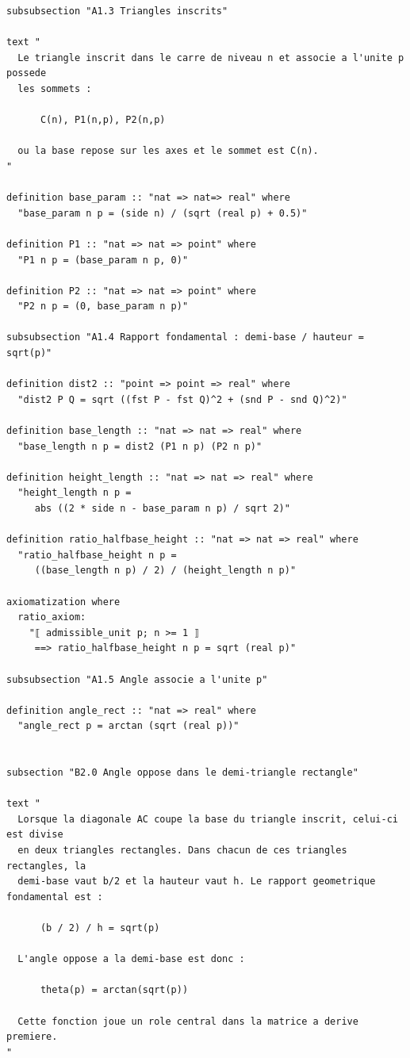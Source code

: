 \documentclass[12pt,a4paper]{article}
\begin{document}
\begin{verbatim}
subsubsection "A1.3 Triangles inscrits"

text "
  Le triangle inscrit dans le carre de niveau n et associe a l'unite p possede
  les sommets :

      C(n), P1(n,p), P2(n,p)

  ou la base repose sur les axes et le sommet est C(n).
"

definition base_param :: "nat => nat=> real" where
  "base_param n p = (side n) / (sqrt (real p) + 0.5)"

definition P1 :: "nat => nat => point" where
  "P1 n p = (base_param n p, 0)"

definition P2 :: "nat => nat => point" where
  "P2 n p = (0, base_param n p)"

subsubsection "A1.4 Rapport fondamental : demi-base / hauteur = sqrt(p)"

definition dist2 :: "point => point => real" where
  "dist2 P Q = sqrt ((fst P - fst Q)^2 + (snd P - snd Q)^2)"

definition base_length :: "nat => nat => real" where
  "base_length n p = dist2 (P1 n p) (P2 n p)"

definition height_length :: "nat => nat => real" where
  "height_length n p =
     abs ((2 * side n - base_param n p) / sqrt 2)"

definition ratio_halfbase_height :: "nat => nat => real" where
  "ratio_halfbase_height n p =
     ((base_length n p) / 2) / (height_length n p)"

axiomatization where
  ratio_axiom:
    "⟦ admissible_unit p; n >= 1 ⟧
     ==> ratio_halfbase_height n p = sqrt (real p)"

subsubsection "A1.5 Angle associe a l'unite p"

definition angle_rect :: "nat => real" where
  "angle_rect p = arctan (sqrt (real p))"


subsection "B2.0 Angle oppose dans le demi-triangle rectangle"

text "
  Lorsque la diagonale AC coupe la base du triangle inscrit, celui-ci est divise
  en deux triangles rectangles. Dans chacun de ces triangles rectangles, la
  demi-base vaut b/2 et la hauteur vaut h. Le rapport geometrique fondamental est :

      (b / 2) / h = sqrt(p)

  L'angle oppose a la demi-base est donc :

      theta(p) = arctan(sqrt(p))

  Cette fonction joue un role central dans la matrice a derive premiere.
"



\end{verbatim}
\end{document}
